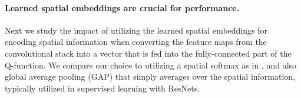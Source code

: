 \documentclass[../thesis.tex]{subfiles}
\begin{document}



\paragraph{Learned spatial embeddings are crucial for performance.} Next we study the impact of utilizing the learned spatial embeddings for encoding spatial information when converting the feature maps from the convolutional stack into a vector that is fed into the fully-connected part of the Q-function. We compare our choice to utilizing a spatial softmax as in \citet{ebert2021bridge}, and also global average pooling (GAP) that simply averages over the spatial information, typically utilized in supervised learning with ResNets.
\end{document}
